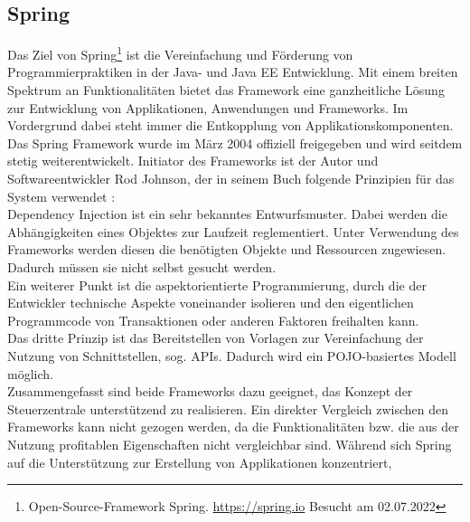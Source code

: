     \subsection{Spring}
    \label{subsec:springBootFramework} 
        Das Ziel von Spring\footnote{Open-Source-Framework Spring. \url{https://spring.io} Besucht am 02.07.2022} 
        ist die Vereinfachung und Förderung von Programmierpraktiken in der Java- und Java EE Entwicklung. Mit einem breiten Spektrum an 
        Funktionalitäten bietet das Framework eine ganzheitliche Lösung zur Entwicklung von Applikationen, Anwendungen und Frameworks. Im Vordergrund dabei steht immer die 
        Entkopplung von Applikationskomponenten. Das Spring Framework wurde im März 2004 offiziell freigegeben und wird seitdem stetig weiterentwickelt. 
        Initiator des Frameworks ist der Autor und Softwareentwickler Rod Johnson, der in seinem Buch folgende Prinzipien für das System verwendet \cite{johnson2004expert}: 
        \\
        \linebreak
        Dependency Injection ist ein sehr bekanntes Entwurfsmuster. Dabei werden die Abhängigkeiten eines Objektes zur Laufzeit reglementiert. Unter 
        Verwendung des Frameworks werden diesen die benötigten Objekte und Ressourcen zugewiesen. Dadurch müssen sie nicht selbst gesucht werden. 
        \\
        \linebreak
        Ein weiterer Punkt ist die aspektorientierte Programmierung, durch die der Entwickler technische Aspekte voneinander isolieren und den eigentlichen Programmcode 
        von Transaktionen oder anderen Faktoren freihalten kann. 
        \\
        \linebreak
        Das dritte Prinzip ist das Bereitstellen von Vorlagen zur Vereinfachung der Nutzung von Schnittstellen, sog. \acs{API}s. Dadurch wird ein \acs{POJO}-basiertes Modell 
        möglich. %
        \\
        \linebreak
        Zusammengefasst sind beide Frameworks dazu geeignet, das Konzept der Steuerzentrale unterstützend zu realisieren. 
        Ein direkter Vergleich zwischen den Frameworks kann nicht gezogen werden, da die Funktionalitäten bzw. die aus der Nutzung 
        profitablen Eigenschaften nicht vergleichbar sind. Während sich Spring auf die Unterstützung zur Erstellung von Applikationen konzentriert, 
